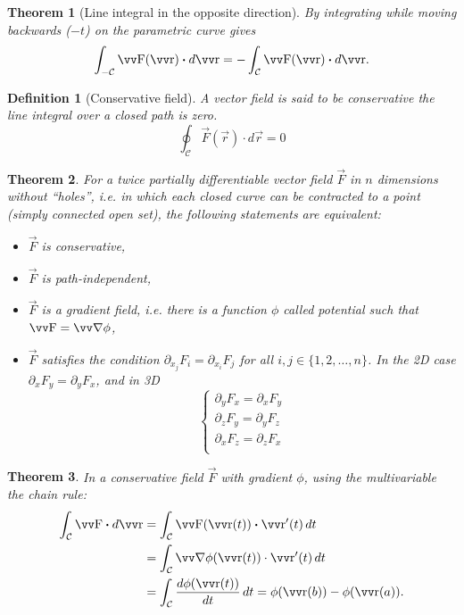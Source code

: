 \documentclass[twocolumn, margin=small]{tex/hsrzf}
\theoremstyle{fuvarzf}
\newtheorem{theorem}{Theorem}
\newtheorem{definition}{Definition}
\begin{document}
\begin{theorem}[Line integral in the opposite direction]
  By integrating while moving backwards (\(-t\)) on the parametric curve gives
  \[
    \int_{-\mathcal{C}} \vec{F}(\vec{r})\dotp d\vec{r}
    = -\int_{\mathcal{C}} \vec{F}(\vec{r})\dotp d\vec{r} .
  \]
\end{theorem}

\begin{definition}[Conservative field]
  A vector field is said to be \emph{conservative} the line integral over a
  closed path is zero.
  \[
    \oint_\mathcal{C} \vec{F}(\vec{r})\cdot d\vec{r} = 0
  \]
\end{definition}

\begin{theorem}
  For a twice partially differentiable vector field \(\vec{F}\) in
  \(n\) dimensions without ``holes'', i.e. in which each closed curve can be
  contracted to a point (simply connected open set), the following statements
  are equivalent:
  \begin{itemize}
    \item \(\vec{F}\) is conservative,
    \item \(\vec{F}\) is path-independent,
    \item \(\vec{F}\) is a \emph{gradient field}, i.e. there is a
      function \(\phi\) called \emph{potential} such that \(\vec{F} = \grad
      \phi\),
    \item \(\vec{F}\) satisfies the condition \(\partial_{x_j} F_i =
      \partial_{x_i} F_j\) for all \(i,j \in \{1,2,\ldots,n\}\). In the 2D case
      \(\partial_x F_y = \partial_y F_x\), and in 3D
      \[
        \begin{cases}
          \partial_y F_x = \partial_x F_y \\
          \partial_z F_y = \partial_y F_z \\
          \partial_x F_z = \partial_z F_x \\
        \end{cases}
      \]
  \end{itemize}
\end{theorem}

\begin{theorem}
  In a conservative field \(\vec{F}\) with gradient \(\phi\), using the
  multivariable the chain rule:
  \begin{align*}
    \int_\mathcal{C} \vec{F} \dotp d\vec{r} 
    &= \int_\mathcal{C} \vec{F}(\vec{r}(t)) \dotp \vec{r}'(t) \,dt \\
    &= \int_\mathcal{C} \grad \phi(\vec{r}(t)) \cdot \vec{r}'(t) \,dt \\
    &= \int_\mathcal{C} \frac{d\phi(\vec{r}(t))}{dt}\,dt
    = \phi(\vec{r}(b)) - \phi(\vec{r}(a)) .
  \end{align*}
\end{theorem}
\end{document}

